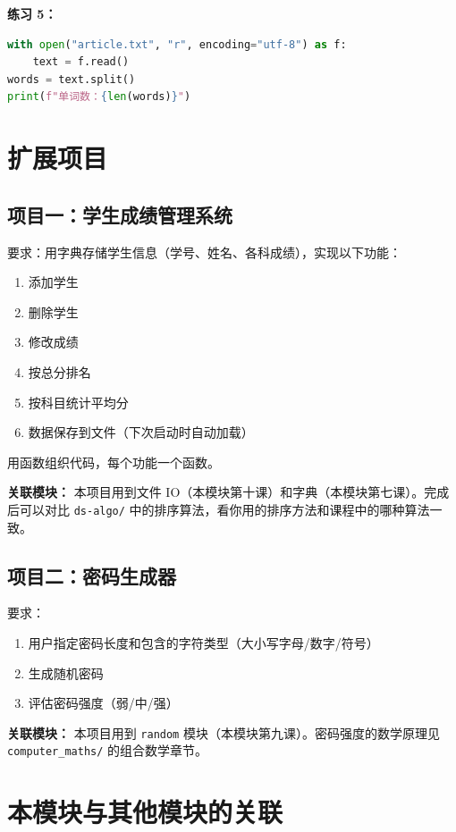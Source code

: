 \documentclass[a4paper,12pt]{ctexart}
\begin{document}
\textbf{练习 5：}
\begin{lstlisting}[language=Python]
with open("article.txt", "r", encoding="utf-8") as f:
    text = f.read()
words = text.split()
print(f"单词数：{len(words)}")
\end{lstlisting}

\section*{扩展项目}

\subsection*{项目一：学生成绩管理系统}

要求：用字典存储学生信息（学号、姓名、各科成绩），实现以下功能：
\begin{enumerate}
  \item 添加学生
  \item 删除学生
  \item 修改成绩
  \item 按总分排名
  \item 按科目统计平均分
  \item 数据保存到文件（下次启动时自动加载）
\end{enumerate}
用函数组织代码，每个功能一个函数。

\textbf{关联模块：} 本项目用到文件 IO（本模块第十课）和字典（本模块第七课）。完成后可以对比 \texttt{ds-algo/} 中的排序算法，看你用的排序方法和课程中的哪种算法一致。

\subsection*{项目二：密码生成器}

要求：
\begin{enumerate}
  \item 用户指定密码长度和包含的字符类型（大小写字母/数字/符号）
  \item 生成随机密码
  \item 评估密码强度（弱/中/强）
\end{enumerate}

\textbf{关联模块：} 本项目用到 \texttt{random} 模块（本模块第九课）。密码强度的数学原理见 \texttt{computer\_maths/} 的组合数学章节。

\section*{本模块与其他模块的关联}
\end{document}

